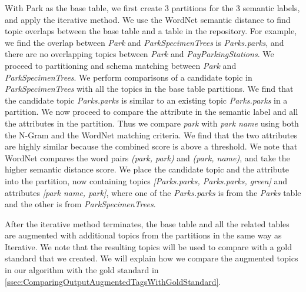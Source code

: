 With Park as the base table, we first create 3 partitions for the 3 semantic labels, and apply the iterative method. We use the WordNet semantic distance to find topic overlaps between the base table and a table in the repository. For example, we find the overlap between \textit{Park} and \textit{ParkSpecimenTrees} is \textit{Parks.parks}, and there are no overlapping topics between \textit{Park} and \textit{PayParkingStations}. We proceed to partitioning and schema matching between \textit{Park} and \textit{ParkSpecimenTrees}. We perform comparisons of a candidate topic in \textit{ParkSpecimenTrees} with all the topics in the base table partitions. We find that the candidate topic \textit{Parks.parks} is similar to an existing topic \textit{Parks.parks} in a partition. We now proceed to compare the attribute in the semantic label and all the attributes in the partition. Thus we compare \textit{park} with \textit{park name} using both the N-Gram and the WordNet matching criteria. We find that the two attributes are highly similar because the combined score is above a threshold. We note that WordNet compares the word pairs \textit{(park, park)} and \textit{(park, name)}, and take the higher semantic distance score. We place the candidate topic and the attribute into the partition, now containing topics \textit{[Parks.parks, Parks.parks, green]} and attributes \textit{[park name, park]}, where one of the \textit{Parks.parks} is from the \textit{Parks} table and the other is from \textit{ParkSpecimenTrees}.

After the iterative method terminates, the base table and all the related tables are augmented with additional topics from the partitions in the same way as Iterative. We note that the resulting topics will be used to compare with a gold standard that we created. We will explain how we compare the augmented topics in our algorithm with the gold standard in \autoref{ssec:ComparingOutputAugmentedTagsWithGoldStandard}.
\endinput